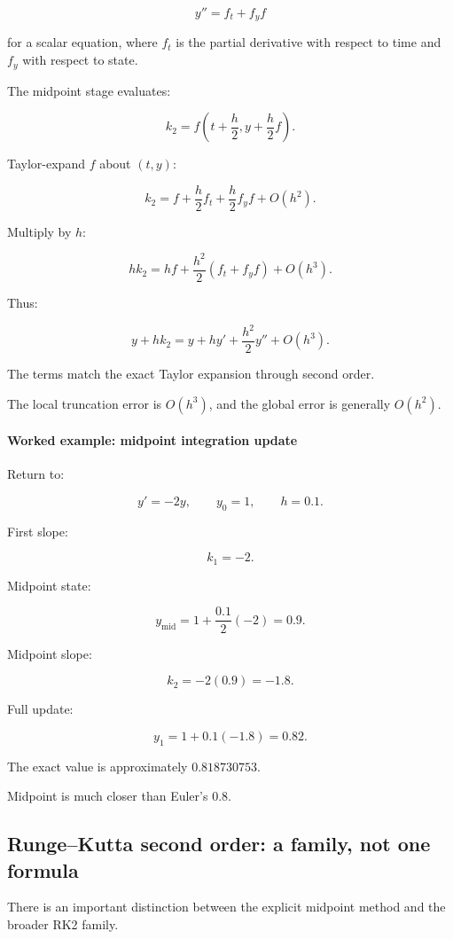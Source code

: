 \[
y''=f_t+f_yf
\]

for a scalar equation, where \(f_t\) is the partial derivative with respect to time and \(f_y\) with respect to state.

The midpoint stage evaluates:

\[
k_2=f\left(t+\frac h2,y+\frac h2f\right).
\]

Taylor-expand \(f\) about \((t,y)\):

\[
k_2 = f+\frac h2f_t+\frac h2f_yf+O(h^2).
\]

Multiply by \(h\):

\[
hk_2 = hf+\frac{h^2}{2}(f_t+f_yf)+O(h^3).
\]

Thus:

\[
y+hk_2 = y+hy'+\frac{h^2}{2}y''+O(h^3).
\]

The terms match the exact Taylor expansion through second order.

The local truncation error is \(O(h^3)\), and the global error is generally \(O(h^2)\).

\paragraph{Worked example: midpoint integration update}\label{02-foundations-ii-ch025-worked-example-midpoint-integration-update}

Return to:

\[
y'=-2y,\qquad y_0=1,\qquad h=0.1.
\]

First slope:

\[
k_1=-2.
\]

Midpoint state:

\[
y_{\mathrm{mid}} = 1+\frac{0.1}{2}(-2) =0.9.
\]

Midpoint slope:

\[
k_2=-2(0.9)=-1.8.
\]

Full update:

\[
y_1=1+0.1(-1.8)=\boxed{0.82}.
\]

The exact value is approximately \(0.818730753\).

Midpoint is much closer than Euler's \(0.8\).

\subsection{Runge--Kutta second order: a family, not one formula}\label{02-foundations-ii-ch025-rungekutta-second-order-a-family-not-one-formula}

There is an important distinction between the explicit midpoint method and the broader RK2 family.


